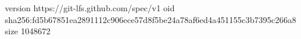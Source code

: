 version https://git-lfs.github.com/spec/v1
oid sha256:fd5b67851ea2891112c906ece57d8f5be24a78af6ed4a451155c3b7395c266a8
size 1048672

